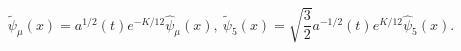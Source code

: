 \begin{equation}
\tilde \psi _\mu (x)= a^{1/2}(t)e^{-K/12}\hat\psi_{\mu}(x),\
\tilde \psi _5 (x)= \sqrt{\frac{3}{2}}a^{-1/2}(t)e^{K/12}\hat\psi_{5}(x).
\end{equation}

